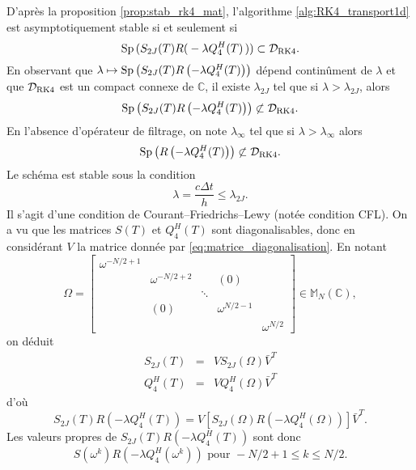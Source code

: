 D'après la proposition \ref{prop:stab_rk4_mat}, l'algorithme \ref{alg:RK4_transport1d} est asymptotiquement stable si et seulement si
\begin{equation}
\Sp \left( S_{2J}(T) R \right( -\lambda Q_{4}^H(T) \left) \right) \subset \mathcal{D}_{\RK4}.
\end{equation}
En observant que $\lambda \mapsto \text{Sp} \left( S_{2J}(T) R \left( -\lambda Q_{4}^H(T) \right) \right)$ dépend continûment de $\lambda$ et que
$\mathcal{D}_{\RK4}$ est un compact connexe de $\mathbb{C}$, il existe $\lambda_{2J}$ tel que si $\lambda > \lambda_{2J}$, alors 
\begin{equation}
\Sp \left( S_{2J}(T) R \left( -\lambda Q_{4}^H(T) \right) \right) \not\subset \mathcal{D}_{\RK4}.
\end{equation}
En l'absence d'opérateur de filtrage, on note $\lambda_{\infty}$ tel que si $\lambda > \lambda_{\infty}$ alors
\begin{equation}
\Sp \left( R \left( -\lambda Q_{4}^H(T) \right) \right) \not\subset \mathcal{D}_{\RK4}.
\end{equation}
Le schéma est stable sous la condition
\begin{equation}
\lambda = \dfrac{c \Delta t}{h} \leq \lambda_{2J}.
\end{equation}
Il s'agit d'une condition de Courant–Friedrichs–Lewy \cite{Courant1928} (notée condition CFL). On a vu que les matrices $S(T)$ et $Q_4^H(T)$ sont diagonalisables, donc en considérant $V$ la matrice donnée par \eqref{eq:matrice_diagonalisation}. En notant
\begin{equation}
\Omega = \begin{bmatrix}
\omega^{-N/2+1} &   &   &   &   \\ 
  & \omega^{-N/2+2} &   & (0) &   \\ 
  &   & \ddots &   &   \\ 
  & (0) &   & \omega^{N/2-1} &   \\ 
  &   &   &   & \omega^{N/2}
\end{bmatrix} \in \mathbb{M}_N(\mathbb{C}),
\end{equation}
on déduit
\begin{equation}
\begin{array}{rcl}
S_{2J}(T) & = & V S_{2J}(\Omega) \bar{V}^T \\
Q_4^H(T) & = & V Q_4^H(\Omega) \bar{V}^T
\end{array}
\end{equation}
d'où
\begin{equation}
S_{2J}(T)R(-\lambda Q_4^H(T)) = V \left[ S_{2J}(\Omega)R(-\lambda Q_4^H(\Omega)) \right] \bar{V}^T.
\end{equation}
Les valeurs propres de $S_{2J}(T)R(-\lambda Q_4^H(T))$ sont donc
\begin{equation}
S(\omega^k)R(-\lambda Q_4^H(\omega^k))  \text{ pour } -N/2+1 \leq k \leq N/2. 
\end{equation}


